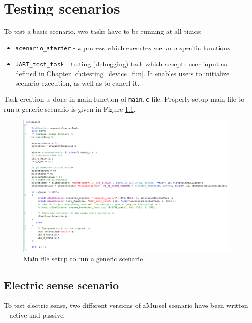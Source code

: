 \chapter{Testing scenarios}

To test a basic scenario, two tasks have to be running at all times:
\begin{itemize}
	\item \texttt{scenario\_starter} - a process which executes scenario specific functions
	\item \texttt{UART\_test\_task} - testing (debugging) task which accepts user input as defined in Chapter \ref{ch:testing_device_fun}. It enables users to initialize scenario execution, as well as to cancel it.
\end{itemize}

Task creation is done in main function of \texttt{main.c} file. Properly setup main file to run a generic scenario is given in Figure \ref{fig:main_c}.

\begin{figure}[htb]
    \centering
	  \includegraphics[width=\linewidth]{figures/Main_scenario.PNG}
	\caption{Main file setup to run a generic scenario}
	\label{fig:main_c}
\end{figure}

\section{Electric sense scenario}

To test electric sense, two different versions of aMussel scenario have been written -- active and passive. 


